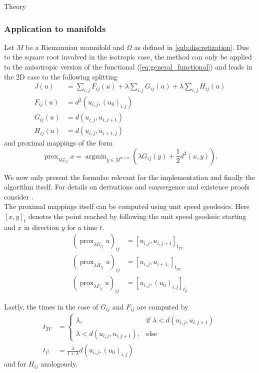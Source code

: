 \begin{chapter}{Theory}
\subsubsection{Application to manifolds} %
\label{ssub:Application to manifolds}
Let $M$ be a Riemannian mannifold and $\Omega$ as defined in \ref{sub:discretization}. Due to the square root involved in the isotropic case,
the method can only be applied to the anisotropic version of the functional (\ref{eq:general_functional}) and leads in the 2D case to the following splitting
\begin{align}
    J(u)	&= \sum_{i,j}F_{ij}(u)+\lambda\sum_{i,j}G_{ij}(u)+\lambda\sum_{i,j}H_{ij}(u)\\
    F_{ij}(u)	&=  d^{2}(u_{i,j},(u_0)_{i,j})\\
    G_{ij}(u)	&=  d(u_{i,j},u_{i,j+1})\\
    H_{ij}(u)	&=  d(u_{i,j},u_{i+1,j})
\end{align}
and proximal mappings of the form
\begin{equation}
\label{eq:real_proximity}
\operatorname{prox}_{\lambda G_{ij}}x=\operatorname{argmin}_{y\in M^{m\times n}}\left(\lambda G_{ij}(y) +\frac{1}{2}d^2(x,y) \right).
\end{equation}

We now only present the formulae relevant for the implementation and finally the algorithm itself. For details on derivations and convergence and existence proofs consider \cite{Weinmann}.\\

The proximal mappings itself can be computed using unit speed geodesics. Here $[x,y]_t$ denotes the point reached by
following the unit speed geodesic starting and $x$ in direction $y$ for a time $t$.
\begin{align}
    (\operatorname{prox}_{\lambda G_{ij}}u)_{ij}&=[u_{i,j},u_{i,j+1}]_{t_{TV}} \\
    (\operatorname{prox}_{\lambda H_{ij}}u)_{ij}&=[u_{i,j},u_{i+1,}]_{t_{TV}} \\
    (\operatorname{prox}_{\lambda F_{ij}}u)_{ij}&=[u_{i,j},(u_0)_{i,j}]_{t_{l^2}}
\end{align}

Lastly, the times in the case of $G_{ij}$ and $F_{ij}$ are computed by
\begin{align}
    t_{TV}&=
    \begin{cases}
	\lambda, &\text{if } \lambda<d(u_{i,j},u_{i,j+1})\\
	\lambda<d(u_{i,j},u_{i,j+1}), & \text{else}
    \end{cases}\\
    t_{l^{2}}&=\frac{\lambda}{1+\lambda}d(u_{i,j},(u_0)_{i,j})
\end{align}
and for $H_{ij}$ analogously.\\


\end{chapter}
